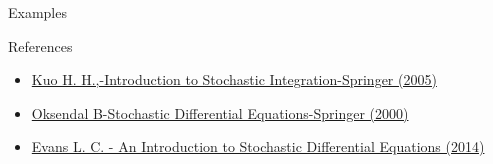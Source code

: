 \documentclass[final]{beamer}
\newlength{\sepwidth}
\newlength{\colwidth}
\newcommand{\separatorcolumn}{\begin{column}{\sepwidth}\end{column}}
\begin{document}
\begin{frame}[t]
\begin{columns}[t]
\begin{column}{\colwidth}
\begin{exampleblock}{Examples}
\begin{itemize}
    \end{itemize}


  \end{exampleblock}

  \begin{block}{References}
    \begin{itemize}
        \item \href{https://drive.google.com/file/d/1vRMD3PfWG5iZTjwdAeLyz3_fwPLslEyn/view?usp=drive_link}{Kuo H. H.,-Introduction to Stochastic Integration-Springer (2005)}
        \item \href{https://drive.google.com/file/d/1dDVWcERBHMOOmIBrovXGwt5KPLrIyRxC/view?usp=drive_link}{Oksendal B-Stochastic Differential Equations-Springer (2000)}
        \item \href{https://drive.google.com/file/d/1EiN6uab1nWAKvLPzE0VfQuoJ4vpF1bjM/view?usp=drive_link}{Evans L. C. - An Introduction to Stochastic Differential Equations (2014)}
    \end{itemize}

  \end{block}

\end{column}

\separatorcolumn
\end{columns}

\end{frame}
\end{document}
